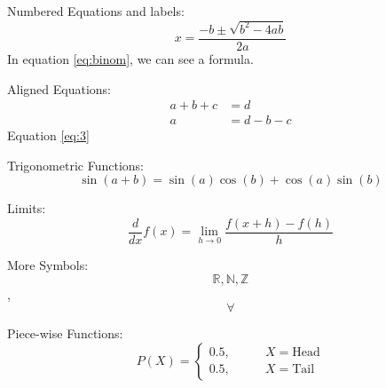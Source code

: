 \documentclass[a4paper, 12pt]{article}
\begin{document}
Numbered Equations and labels:
\begin{equation}\label{eq:binom}
x = \frac{-b \pm \sqrt{b^2 - 4ab}}{2a}
\end{equation}
In equation \ref{eq:binom}, we can see a formula.

Aligned Equations:
\begin{align}
    a + b + c &= d\\
    a &= d - b - c\label{eq:3}
\end{align}
Equation \ref{eq:3}

Trigonometric Functions:
$$\sin(a + b) = \sin(a)\cos(b) + \cos(a)\sin(b)$$

Limits:
$$\frac{d}{dx}f(x) = \lim_{h \to 0}\frac{f(x + h) - f(h)}{h}$$

More Symbols:
$$\mathbb{R}, \mathbb{N}, \mathbb{Z}$$, $$\forall$$

Piece-wise Functions:
$$P(X) = \begin{cases}
0.5, & \qquad X = \text{Head}\\
0.5, & \qquad X = \text{Tail}
\end{cases}$$
\end{document}
